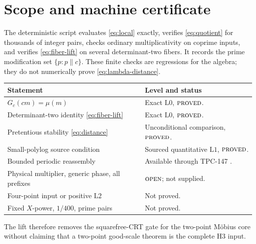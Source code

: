 \documentclass[11pt]{article}
\theoremstyle{definition}
\theoremstyle{remark}
\newcommand{\Lzero}{\mathrm{L0}}
\newcommand{\Lone}{\mathrm{L1}}
\newcommand{\Ltwo}{\mathrm{L2}}
\newcommand{\PROVED}{\textnormal{\textsc{proved}}}
\newcommand{\OPEN}{\textnormal{\textsc{open}}}
\begin{document}
\section{Scope and machine certificate}

The deterministic script evaluates \eqref{eq:local} exactly,
verifies \eqref{eq:quotient} for thousands of integer pairs, checks
ordinary multiplicativity on coprime inputs, and verifies
\eqref{eq:fiber-lift} on several determinant-two fibers.  It records
the prime modification set \(\{p:p\parallel c\}\).  These finite
checks are regressions for the algebra; they do not numerically prove
\eqref{eq:lambda-distance}.

\begin{center}
\small
\begin{tabularx}{\textwidth}{@{}p{}Y@{}}
\toprule
Statement & Level and status\\
\midrule
\(G_c(cm)=\mu(m)\) & Exact \(\Lzero\), \(\PROVED\).\\
Determinant-two identity \eqref{eq:fiber-lift} &
Exact \(\Lzero\), \(\PROVED\).\\
Pretentious stability \eqref{eq:distance} &
Unconditional comparison, \(\PROVED\).\\
Small-polylog source condition &
Sourced quantitative \(\Lone\), \(\PROVED\).\\
Bounded periodic reassembly &
Available through TPC-147 \citep{WangTPC147}.\\
Physical multiplier, generic phase, all prefixes &
\(\OPEN\); not supplied.\\
Four-point input or positive \(\Ltwo\) &
Not proved.\\
Fixed \(X\)-power, \(1/400\), prime pairs &
Not proved.\\
\bottomrule
\end{tabularx}
\end{center}

The lift therefore removes the squarefree-CRT gate for the two-point
M\"obius core without claiming that a two-point good-scale theorem
is the complete H3 input.

\begingroup
\footnotesize
\raggedright


\endgroup
\end{document}
